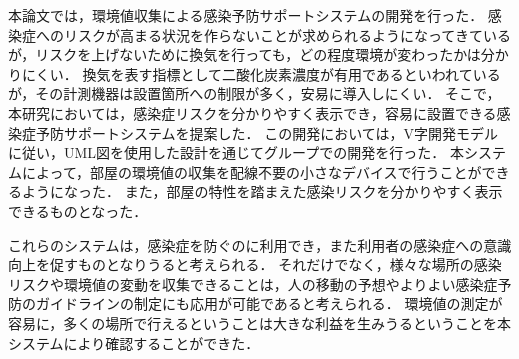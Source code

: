 
本論文では，環境値収集による感染予防サポートシステムの開発を行った．
感染症へのリスクが高まる状況を作らないことが求められるようになってきているが，リスクを上げないために換気を行っても，どの程度環境が変わったかは分かりにくい．
換気を表す指標として二酸化炭素濃度が有用であるといわれているが，その計測機器は設置箇所への制限が多く，安易に導入しにくい．
そこで，本研究においては，感染症リスクを分かりやすく表示でき，容易に設置できる感染症予防サポートシステムを提案した．
この開発においては，V字開発モデルに従い，UML図を使用した設計を通じてグループでの開発を行った．
本システムによって，部屋の環境値の収集を配線不要の小さなデバイスで行うことができるようになった．
また，部屋の特性を踏まえた感染リスクを分かりやすく表示できるものとなった．

これらのシステムは，感染症を防ぐのに利用でき，また利用者の感染症への意識向上を促すものとなりうると考えられる．
それだけでなく，様々な場所の感染リスクや環境値の変動を収集できることは，人の移動の予想やよりよい感染症予防のガイドラインの制定にも応用が可能であると考えられる．
環境値の測定が容易に，多くの場所で行えるということは大きな利益を生みうるということを本システムにより確認することができた．

